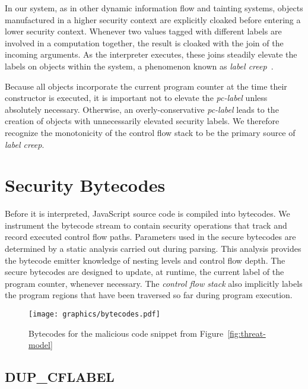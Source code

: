 \documentclass{llncs}
\begin{document}
In our system, as in other dynamic information flow and tainting systems, objects manufactured in a higher security context are explicitly cloaked before entering a lower security context.
Whenever two values tagged with different labels are involved in a computation together, the result is cloaked with the join of the incoming arguments.
As the interpreter executes, these joins steadily elevate the labels on objects within the system, a phenomenon known as \textit{label creep}~\cite{1159651}.

Because all objects incorporate the current program counter at the time their constructor is executed, it is important not to elevate the \textit{pc-label} unless absolutely necessary.
Otherwise, an overly-conservative \textit{pc-label} leads to the creation of objects with unnecessarily elevated security labels.
We therefore recognize the monotonicity of the control flow stack to be the primary source of \textit{label creep}.



\section{Security Bytecodes}
\label{sec:security-bytecodes}

Before it is interpreted, JavaScript source code is compiled into bytecodes.
We instrument the bytecode stream to contain security operations that track and record executed control flow paths.
Parameters used in the secure bytecodes are determined by a static analysis carried out during parsing.
This analysis provides the bytecode emitter knowledge of nesting levels and control flow depth.
The secure bytecodes are designed to update, at runtime, the current label of the program counter, whenever necessary.
The \textit{control flow stack} also implicitly labels the program regions that have been traversed so far during program execution.

\begin{figure}[ht]
  \centerline{\texttt{[image: graphics/bytecodes.pdf]}}
  \caption{Bytecodes for the malicious code snippet from Figure~\ref{fig:threat-model}}
  \label{fig:bytecodes}
\end{figure}

\subsection{DUP\_CFLABEL}
\end{document}
